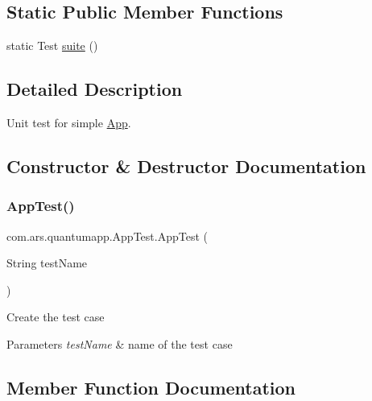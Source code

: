 \subsection*{Static Public Member Functions}
\begin{DoxyCompactItemize}
\item 
static Test \hyperlink{classcom_1_1ars_1_1quantumapp_1_1_app_test_a59952e08bf166edc6c98639f14442fed}{suite} ()
\end{DoxyCompactItemize}


\subsection{Detailed Description}
Unit test for simple \hyperlink{classcom_1_1ars_1_1quantumapp_1_1_app}{App}. 

\subsection{Constructor \& Destructor Documentation}
\hypertarget{classcom_1_1ars_1_1quantumapp_1_1_app_test_ad1892904405d218e652b29e79de2de1d}{}\label{classcom_1_1ars_1_1quantumapp_1_1_app_test_ad1892904405d218e652b29e79de2de1d} 
\subsubsection{\texorpdfstring{App\+Test()}{AppTest()}}
{\footnotesize\ttfamily com.\+ars.\+quantumapp.\+App\+Test.\+App\+Test (\begin{DoxyParamCaption}\item[{String}]{test\+Name }\end{DoxyParamCaption})}

Create the test case


\begin{DoxyParams}{Parameters}
{\em test\+Name} & name of the test case \\
\hline
\end{DoxyParams}


\subsection{Member Function Documentation}
\hypertarget{classcom_1_1ars_1_1quantumapp_1_1_app_test_a59952e08bf166edc6c98639f14442fed}{}\label{classcom_1_1ars_1_1quantumapp_1_1_app_test_a59952e08bf166edc6c98639f14442fed} 
